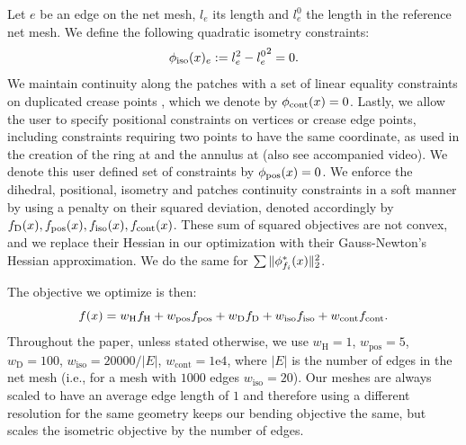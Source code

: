 Let $e$ be an edge on the net mesh, $l_e$ its length and $l_e^0$ the length in the reference net mesh. We define the following quadratic isometry constraints:
\begin{equation}
\phi_\text{iso}(x)_e := l_e^2 - {l_e^0}^2 = 0.
\end{equation}
We maintain continuity along the patches with a set of linear equality constraints on duplicated crease points \cite{rabi2018shape}, which we denote by $\phi_\text{cont}(x) = 0$. Lastly, we allow the user to specify positional constraints on vertices or crease edge points, including constraints requiring two points to have the same coordinate, as used in the creation of the ring at  and the annulus at  (also see accompanied video). We denote this user defined set of constraints by $\phi_{\text{pos}}(x) = 0$.
We enforce the dihedral, positional, isometry and patches continuity constraints in a soft manner by using a penalty on their squared deviation, denoted accordingly by $f_\text{D}(x), f_\text{pos}(x), f_\text{iso}(x), f_\text{cont}(x)$. These sum of squared objectives are not convex, and we replace their Hessian in our optimization with their Gauss-Newton's Hessian approximation. We do the same for $\sum \|\phi^*_{f_i}(x)\|_2^2$.

The objective we optimize is then:
\begin{equation} \label{eq:opt}
f(x) = w_\text{H}f_\text{H}+w_\text{pos}f_\text{pos}+w_\text{D}f_\text{D}+w_\text{iso}f_\text{iso}+w_\text{cont}f_\text{cont}.
\end{equation}
Throughout the paper, unless stated otherwise, we use $w_\text{H} = 1$, $w_\text{pos}=5$, $w_\text{D} = 100$, $w_\text{iso}= {20000}/{|E|}$, $w_\text{cont} = \text{1e4}$, where $|E|$ is the number of edges in the net mesh (i.e., for a mesh with $1000$ edges $w_\text{iso}=20$). Our meshes are always scaled to have an average edge length of $1$ and therefore using a different resolution for the same geometry keeps our bending objective the same, but scales the isometric objective by the number of edges.

